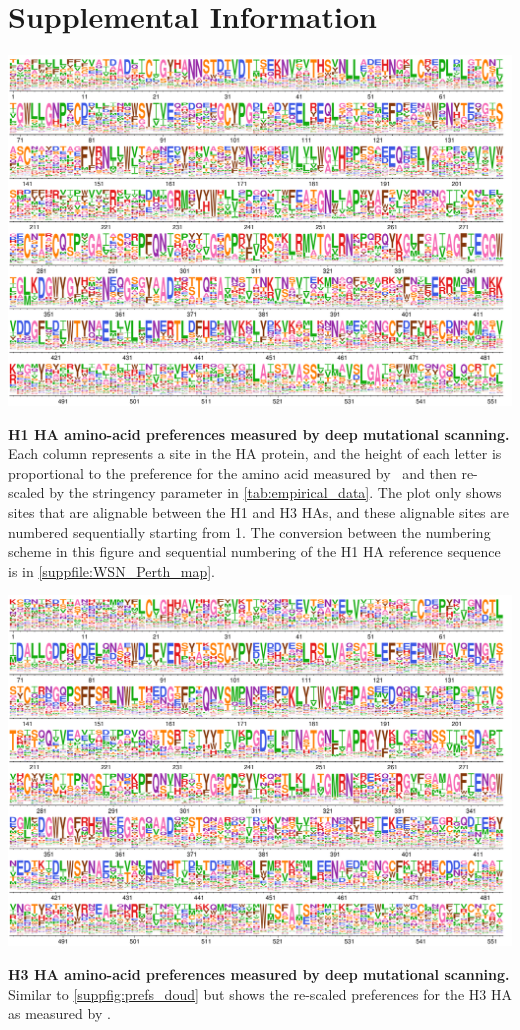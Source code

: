 \documentclass[11pt]{article}
\begin{document}
\newpage
\section*{Supplemental Information}

\begin{suppfig}[H]
\centerline{\includegraphics[width=\textwidth]{figures/prefs_doud}}
\caption{\label{suppfig:prefs_doud}
\textbf{H1 HA amino-acid preferences measured by deep mutational scanning.}
Each column represents a site in the HA protein, and the height of each letter is proportional to the preference for the amino acid measured by~\citet{doud2016accurate} and then re-scaled by the stringency parameter in \ref{tab:empirical_data}. 
The plot only shows sites that are alignable between the H1 and H3 HAs, and these alignable sites are numbered sequentially starting from 1.
The conversion between the numbering scheme in this figure and sequential numbering of the H1 HA reference sequence is in \ref{suppfile:WSN_Perth_map}. 
}
\end{suppfig}
\clearpage 


\begin{suppfig}[H]
\centerline{\includegraphics[width=\textwidth]{figures/prefs_lee}}
\caption{\label{suppfig:prefs_lee}
\textbf{H3 HA amino-acid preferences measured by deep mutational scanning.}
Similar to \ref{suppfig:prefs_doud} but shows the re-scaled preferences for the H3 HA as measured by \citet{lee2018deep}.
 }
\end{suppfig}
\clearpage 
\end{document}
